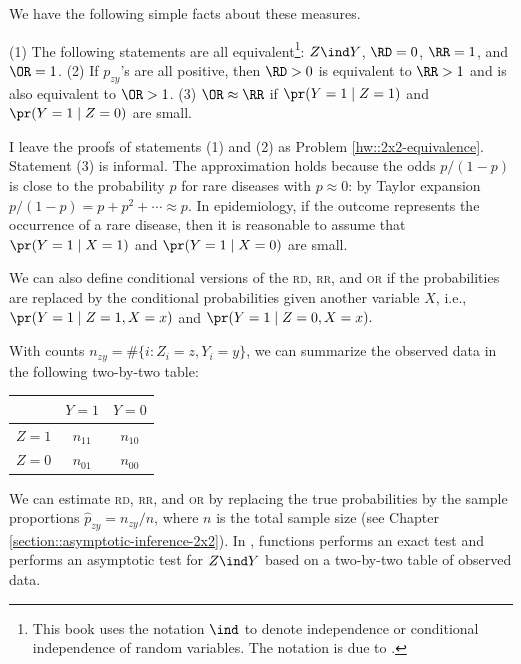  
We have the following simple facts about these measures.
\begin{proposition}\label{prop::2x2-independence}
(1) The following statements are all equivalent\footnote{This book uses the notation $\ind$ to denote independence or conditional independence of random variables. The notation is due to \citet{dawid1979conditional}.}: $Z\ind Y $, $\RD = 0$, $\RR = 1$, and $\OR = 1$. 
(2) If $p_{zy}$'s are all positive, then $\RD >0$ is equivalent to $\RR >1$ and is also equivalent to $\OR > 1$. 
(3)
$\OR \approx \RR$ if  $\pr(Y=1\mid Z=1)$ and $ \pr(Y=1\mid Z=0)$ are small. 
\end{proposition}

I leave the proofs of statements (1) and (2) as Problem \ref{hw::2x2-equivalence}. Statement (3) is informal. The approximation holds because the odds $p/(1-p)$ is close to the probability $p$ for rare diseases with $p\approx 0$: by Taylor expansion $p/(1-p) = p + p^2 + \cdots\approx p $. In epidemiology, if the outcome represents the occurrence of a rare disease, then it is reasonable to assume that $\pr(Y=1\mid X=1)$ and $ \pr(Y=1\mid X=0)$ are small. 
 

 
We can also define conditional versions of the \textsc{rd}, \textsc{rr}, and \textsc{or}  if the probabilities are replaced by the conditional probabilities given another variable $X$, i.e., $\pr(Y=1\mid Z=1, X=x) $ and $ \pr(Y=1\mid Z=0, X=x)  .$
 
 
With counts $n_{zy} = \#\{i:  Z_i=z, Y_i=y \}$, we can summarize the observed data in the following two-by-two table:
 \begin{center}
\begin{tabular}{lcc}
\hline 
        & $Y =1$ & $Y =0$\\\hline
$Z =1$ & $n_{11}$ & $n_{10}$\\ 
$Z =0$ & $n_{01}$ & $n_{00}$\\ 
\hline 
\end{tabular}
\end{center}
We can estimate  \textsc{rd}, \textsc{rr}, and \textsc{or}  by replacing the true probabilities by the sample proportions $\hat p_{zy} = n_{zy}  / n$, where $n$ is the total sample size (see Chapter \ref{section::asymptotic-inference-2x2}). In , functions  performs an exact test and  performs an asymptotic test for   $Z \ind Y$ based on a two-by-two table of observed data. 
 
